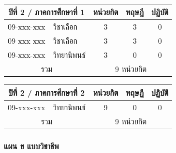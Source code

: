 \vspace{5ex}\par\noindent
\renewcommand{\arraystretch}{1.4}
\begin{tabular}{|cp{}|ccc|}
\hline
\multicolumn{2}{|c|}{ปีที่ 2 / ภาคการศึกษาที่ 1} & \multicolumn{1}{c|}{หน่วยกิต} & \multicolumn{1}{c|}{ทฤษฎี} & \multicolumn{1}{c|}{ปฏิบัติ}  \\ \hline
\multicolumn{1}{|c|}{09-xxx-xxx}  & วิชาเลือก  & \multicolumn{1}{c|}{3}        & \multicolumn{1}{c|}{3}     & \multicolumn{1}{c|}{0}                    \\ \hline
\multicolumn{1}{|c|}{09-xxx-xxx}  & วิชาเลือก  & \multicolumn{1}{c|}{3}        & \multicolumn{1}{c|}{3}     & \multicolumn{1}{c|}{0}                    \\ \hline
\multicolumn{1}{|c|}{09-xxx-xxx}  & วิทยานิพนธ์  & \multicolumn{1}{c|}{3}        & \multicolumn{1}{c|}{0}     & \multicolumn{1}{c|}{0}                    \\ \hline
\multicolumn{2}{|c|}{รวม}                        & \multicolumn{3}{c|}{9 หน่วยกิต}                                                                            \\ \hline
\end{tabular}

\vspace{5ex}\par\noindent
\renewcommand{\arraystretch}{1.4}
\begin{tabular}{|cp{}|ccc|}
\hline
\multicolumn{2}{|c|}{ปีที่ 2 / ภาคการศึกษาที่ 2} & \multicolumn{1}{c|}{หน่วยกิต} & \multicolumn{1}{c|}{ทฤษฎี} & \multicolumn{1}{c|}{ปฏิบัติ}  \\ \hline
\multicolumn{1}{|c|}{09-xxx-xxx}  & วิทยานิพนธ์  & \multicolumn{1}{c|}{9}        & \multicolumn{1}{c|}{0}     & \multicolumn{1}{c|}{0}                    \\ \hline
\multicolumn{2}{|c|}{รวม}                        & \multicolumn{3}{c|}{9 หน่วยกิต}                                                                            \\ \hline
\end{tabular}


\newpage
\subsubsection*{แผน ข แบบวิชาชีพ}


